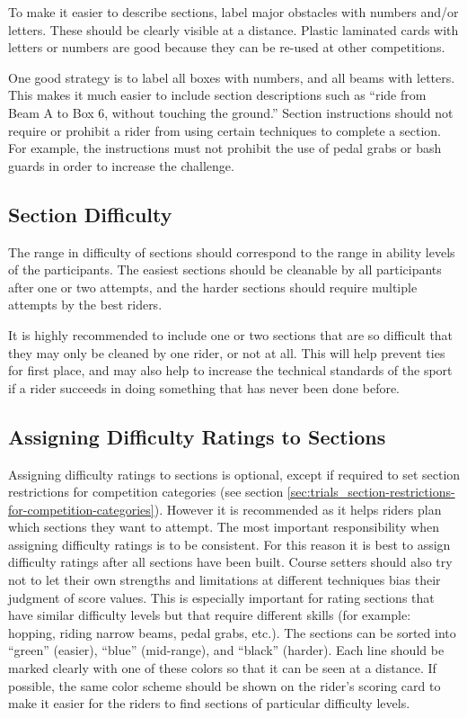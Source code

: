 To make it easier to describe sections, label major obstacles with numbers and/or letters. 
These should be clearly visible at a distance. 
Plastic laminated cards with letters or numbers are good because they can be re-used at other competitions.

One good strategy is to label all boxes with numbers, and all beams with letters. 
This makes it much easier to include section descriptions such as ``ride from Beam A to Box 6, without touching the ground.''
Section instructions should not require or prohibit a rider from using certain techniques to complete a section. 
For example, the instructions must not prohibit the use of pedal grabs or bash guards in order to increase the challenge.

\subsection{Section Difficulty}
The range in difficulty of sections should correspond to the range in ability levels of the participants. 
The easiest sections should be cleanable by all participants after one or two attempts, and the harder sections should require multiple attempts by the best riders.

It is highly recommended to include one or two sections that are so difficult that they may only be cleaned by one rider, or not at all. 
This will help prevent ties for first place, and may also help to increase the technical standards of the sport if a rider succeeds in doing something that has never been done before.

\subsection{Assigning Difficulty Ratings to Sections \label{subsec:trials_guidelines-for-course-setters_assigning-difficulty-ratings}}
Assigning difficulty ratings to sections is optional, except if required to set section restrictions for competition categories (see section \ref{sec:trials_section-restrictions-for-competition-categories}).
However it is recommended as it helps riders plan which sections they want to attempt. 
The most important responsibility when assigning difficulty ratings is to be consistent.
For this reason it is best to assign difficulty ratings after all sections have been built.
Course setters should also try not to let their own strengths and limitations at different techniques bias their judgment of score values.
This is especially important for rating sections that have similar difficulty levels but that require different skills (for example: hopping, riding narrow beams, pedal grabs, etc.). 
The sections can be sorted into ``green'' (easier), ``blue'' (mid-range), and ``black'' (harder).
Each line should be marked clearly with one of these colors so that it can be seen at a distance.
If possible, the same color scheme should be shown on the rider's scoring card to make it easier for the riders to find sections of particular difficulty levels.

